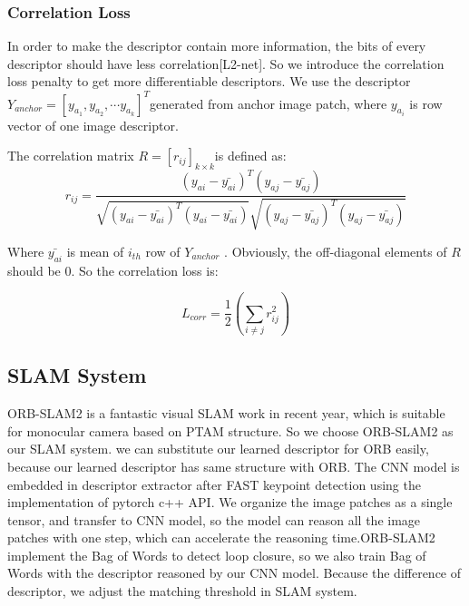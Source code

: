 \documentclass{svproc}
\begin{document}
\subsubsection{Correlation Loss} 
In order to make the descriptor contain more information, the bits of every descriptor should have less correlation[L2-net]. So we introduce the correlation loss penalty to get more differentiable descriptors. We use the descriptor       $ Y_{anchor} = \left [ y_{a_1}, y_{a_2},\cdots y_{a_k}\right ]^{T} $generated from anchor image patch, where  $y_{a_i}$ is row vector of one image descriptor.

The correlation matrix $ R=[r_{ij}]_{k \times k} $is defined as:
\begin{equation}
r_{ij} = \frac{(y_{ai}-\bar{y_{ai}})^{T}(y_{aj}-\bar{y_{aj}})}{\sqrt{(y_{ai}-\bar{y_{ai}})^{T}(y_{ai}-\bar{y_{ai}})}\sqrt{(y_{aj}-\bar{y_{aj}})^{T}(y_{aj}-\bar{y_{aj}})}} 
\end{equation}

Where $ \bar{y_{ai}}$  is mean of $i_{th}$ row of $Y_{anchor}$ . Obviously, the off-diagonal elements of $R$ should be 0. So the correlation loss is:

\begin{equation}
L_{corr}=\frac{1}{2} \left(\sum\limits_{i \neq j} r_{ij}^2 \right)
\end{equation}

\subsection{SLAM System} 

ORB-SLAM2 is a fantastic visual SLAM work in recent year, which is suitable for monocular camera based on PTAM structure. So we choose ORB-SLAM2 as our SLAM system. we can substitute our learned descriptor for ORB easily, because our learned descriptor has same structure with ORB. The CNN model is embedded in descriptor extractor after FAST keypoint detection using the implementation of pytorch c++ API. We organize the image patches as a single tensor, and transfer to CNN model, so the model can reason all the image patches with one step, which can accelerate the reasoning time.ORB-SLAM2 implement the Bag of Words to detect loop closure, so we also train Bag of Words with the descriptor reasoned by our CNN model. Because the difference of descriptor, we adjust the matching threshold in SLAM system.

\end{document}

